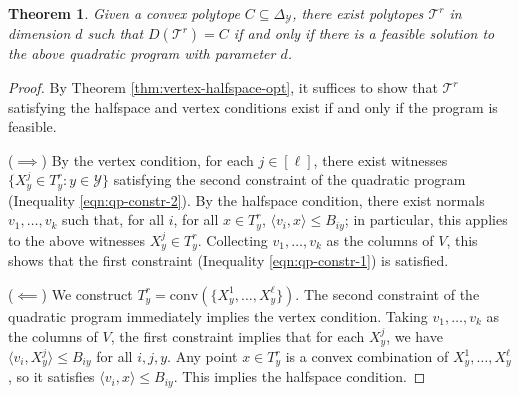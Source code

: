 \documentclass[12pt]{article}
\newcommand{\simplex}{\Delta_\Y}
\newcommand{\T}{\mathcal{T}}
\newcommand{\Y}{\mathcal{Y}}
\newcommand{\inprod}[2]{\langle #1, #2 \rangle}%
\newcommand{\conv}{\mathrm{conv}}
\newtheorem{theorem}{Theorem}
\begin{document}
  \begin{theorem}
  	Given a convex polytope $C \subseteq \simplex$, there exist polytopes $\T^r$ in dimension $d$ such that $D(\T^r) = C$ if and only if there is a feasible solution to the above quadratic program with parameter $d$.
  \end{theorem}
  \begin{proof}
    By Theorem \ref{thm:vertex-halfspace-opt}, it suffices to show that $\T^r$ satisfying the halfspace and vertex conditions exist if and only if the program is feasible.

    ($\implies$) 
    By the vertex condition, for each $j \in [\ell]$, there exist witnesses $\{X^j_y \in T^r_y : y \in \Y\}$ satisfying the second constraint of the quadratic program (Inequality \ref{eqn:qp-constr-2}).
    By the halfspace condition, there exist normals $v_1, \dots, v_k$ such that, for all $i$, for all $x \in T^r_y$, $\inprod{v_i}{x} \leq B_{iy}$; in particular, this applies to the above witnesses $X^j_y \in T^r_y$.
    Collecting $v_1,\dots,v_k$ as the columns of $V$, this shows that the first constraint (Inequality \ref{eqn:qp-constr-1}) is satisfied.

    \bigskip
    ($\impliedby$)
    We construct $T^r_y = \conv(\{X^1_y, \ldots, X^{\ell}_y\})$.
    The second constraint of the quadratic program immediately implies the vertex condition.
    Taking $v_1,\dots,v_k$ as the columns of $V$, the first constraint implies that for each $X^j_y$, we have $\inprod{v_i}{X^j_y} \leq B_{iy}$ for all $i,j,y$.
    Any point $x \in T^r_y$ is a convex combination of $X^1_y,\ldots,X^{\ell}_y$, so it satisfies $\inprod{v_i}{x} \leq B_{iy}$.
    This implies the halfspace condition.  %


\end{proof}
\end{document}
